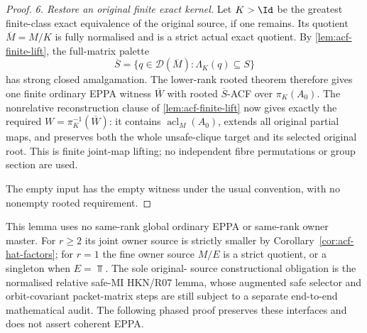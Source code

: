 \begin{proof}
\medskip\noindent
\emph{6. Restore an original finite exact kernel.}
Let \(K>\Id\) be the greatest finite-class exact equivalence
of the original source, if one remains. Its quotient
\(\overline M=M/K\) is fully normalised and is a strict actual
exact quotient. By \cref{lem:acf-finite-lift}, the full-matrix
palette
\[
 \overline S=\{q\in\mathcal D(\overline M):
                  \Lambda_K(q)\subseteq S\}
\]
has strong closed amalgamation. The lower-rank rooted theorem
therefore gives one finite ordinary EPPA witness
\(\overline W\) with rooted \(\overline S\)-ACF over
\(\pi_K(A_0)\). The nonrelative reconstruction clause of
\cref{lem:acf-finite-lift} now gives exactly the required
\(W=\pi_K^{-1}(\overline W)\): it contains
\(\operatorname{acl}_M(A_0)\), extends all original partial maps,
and preserves both the whole unsafe-clique target and its
selected original root. This is finite joint-map lifting;
no independent fibre permutations or group section are used.

The empty input has the empty witness
under the usual convention, with no
nonempty rooted requirement.
\end{proof}

\begin{remark}
\label{rem:acf-firewall}
This lemma uses no same-rank global ordinary EPPA or
same-rank owner master.  For $r\ge2$ its joint owner
source is strictly smaller by
Corollary~\ref{cor:acf-hat-factors}; for $r=1$
the fine owner source $M/E$ is a strict quotient,
or a singleton when $E=\Top$.  The sole original-
source constructional obligation is the normalised
relative safe-MI HKN/R07 lemma, whose augmented safe
selector and orbit-covariant packet-matrix steps are
still subject to a separate end-to-end mathematical audit.
The following phased proof preserves these interfaces
and does not assert coherent EPPA.
\end{remark}
